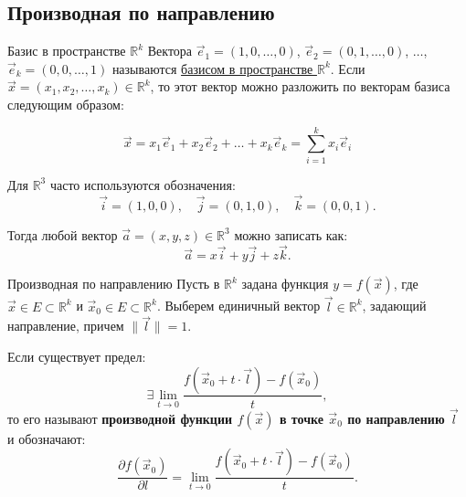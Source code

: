 \subsection{Производная по направлению}

\begin{tbox}{Базис в пространстве \(\mathbb{R}^k\)}
	Вектора \(\vec{e}_1 = (1,0,\dots, 0)\), \(\vec{e}_2 = (0,1,\dots, 0)\), \(\dots\), \(\vec{e}_k = (0,0,\dots, 1)\) называются \uline{базисом в пространстве \(\mathbb{R}^k\)}. Если \(\vec{x} = (x_1, x_2, \dots, x_k) \in \mathbb{R}^k\), то этот вектор можно разложить по векторам базиса следующим образом:

	\begin{equation*}
		\boxed{
			\vec{x} = x_1 \vec{e}_1 + x_2 \vec{e}_2 + \dots + x_k \vec{e}_k = \sum_{i=1}^k x_i \vec{e}_i
		}
	\end{equation*}

	Для \(\mathbb{R}^3\) часто используются обозначения:
	\[
	\vec{i} = (1,0,0), \quad \vec{j} = (0,1,0), \quad \vec{k} = (0,0,1).
	\]

	Тогда любой вектор \(\vec{a} = (x, y, z) \in \mathbb{R}^3\) можно записать как:
	\[
	\vec{a} = x \vec{i} + y \vec{j} + z \vec{k}.
	\]
\end{tbox}

\begin{tbox}{Производная по направлению}
	Пусть в \(\mathbb{R}^k\) задана функция \(y = f(\vec{x})\), где \(\vec{x} \in E \subset \mathbb{R}^k\) и \(\vec{x}_0 \in E \subset \mathbb{R}^k\). Выберем единичный вектор \(\vec{l} \in \mathbb{R}^k\), задающий направление, причем \(\|\vec{l}\| = 1\).

	Если существует предел:
	\[
	\exists \lim_{t \to 0} \frac{f(\vec{x}_0 + t \cdot \vec{l}) - f(\vec{x}_0)}{t},
	\]
	то его называют \textbf{производной функции \(f(\vec{x})\) в точке \(\vec{x}_0\) по направлению \(\vec{l}\)} и обозначают:
	\begin{equation*}
		\frac{\partial f(\vec{x}_0)}{\partial l} = \lim_{t \to 0} \frac{f(\vec{x}_0 + t \cdot \vec{l}) - f(\vec{x}_0)}{t}.
	\end{equation*}
\end{tbox}

